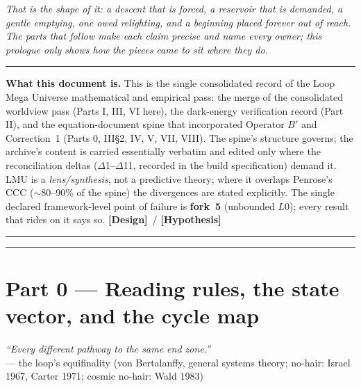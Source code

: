 \documentclass[11pt]{article}
\newcommand{\Hyp}{\textbf{\textcolor{blue!55!black}{[Hypothesis]}}}
\newcommand{\Design}{\textbf{\textcolor{purple!65!black}{[Design]}}}
\begin{document}
\medskip
\noindent\emph{That is the shape of it: a descent that is forced, a reservoir that is demanded, a gentle emptying, one owed relighting, and a beginning placed forever out of reach. The parts that follow make each claim precise and name every owner; this prologue only shows how the pieces came to sit where they do.}

\vspace{6pt}\hrule\vspace{8pt}

\noindent\textbf{What this document is.} This is the single consolidated record of the Loop Mega Universe mathematical and empirical pass: the merge of the consolidated worldview pass (Parts I, III, VI here), the dark-energy verification record (Part II), and the equation-document spine that incorporated Operator $B'$ and Correction~1 (Parts 0, III\S2, IV, V, VII, VIII). The spine's structure governs; the archive's content is carried essentially verbatim and edited only where the reconciliation deltas ($\Delta$1--$\Delta$11, recorded in the build specification) demand it. LMU is a \emph{lens/synthesis}, not a predictive theory; where it overlaps Penrose's CCC ($\sim$80--90\% of the spine) the divergences are stated explicitly. The single declared framework-level point of failure is \textbf{fork~5} (unbounded $L0$); every result that rides on it says so. \Design\ / \Hyp
\vspace{4pt}\hrule\vspace{4pt}
\tableofcontents
\vspace{4pt}\hrule\vspace{8pt}

\part*{Part 0 --- Reading rules, the state vector, and the cycle map}
\begin{flushright}\small\emph{``Every different pathway to the same end zone.''}\\[-1pt]{\footnotesize --- the loop's equifinality (von Bertalanffy, general systems theory; no-hair: Israel 1967, Carter 1971; cosmic no-hair: Wald 1983)}\end{flushright}
\setcounter{section}{0}\setcounter{equation}{0}\setcounter{figure}{0}
\end{document}

